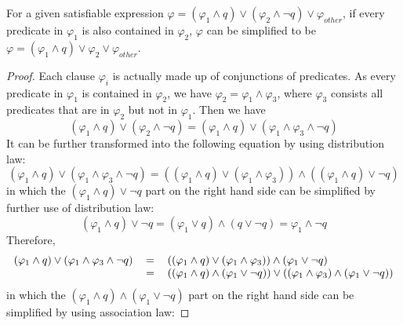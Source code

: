 \begin{theorem}
For a given satisfiable expression $\varphi = (\varphi _{1} \wedge q) \vee (\varphi _{2} \wedge \neg q) \vee \varphi _{other}$, if every predicate in $\varphi _{1}$ is also contained in $\varphi _{2}$,
$\varphi$ can be simplified to be $\varphi = (\varphi _{1} \wedge q) \vee \varphi _{2} \vee \varphi _{other}$.
\end{theorem}
\begin{proof}
Each clause $\varphi _{i}$ is actually made up of conjunctions of predicates. As every predicate in $\varphi _{1}$ is contained in $\varphi _{2}$, we have $\varphi _{2} = \varphi _{1} \wedge \varphi _{3}$,
where $\varphi _{3}$ consists all predicates that are in $\varphi _{2}$ but not in $\varphi _{1}$. Then we have
\begin{equation}
(\varphi _{1} \wedge q) \vee (\varphi _{2} \wedge \neg q) = (\varphi _{1} \wedge q) \vee (\varphi _{1} \wedge \varphi _{3} \wedge \neg q)
\end{equation}
It can be further transformed into the following equation by using distribution law:
\begin{equation}
(\varphi _{1} \wedge q) \vee (\varphi _{1} \wedge \varphi _{3} \wedge \neg q) = ((\varphi _{1} \wedge q) \vee (\varphi _{1} \wedge \varphi _{3})) \wedge ((\varphi _{1} \wedge q) \vee \neg q)
\end{equation}
in which the $(\varphi _{1} \wedge q) \vee \neg q$ part on the right hand side can be simplified by further use of distribution law:
\begin{equation}
(\varphi _{1} \wedge q) \vee \neg q = (\varphi _{1} \vee q) \wedge (q \vee \neg q) = \varphi _{1} \wedge \neg q
\end{equation}
Therefore,
\begin{equation}
\begin{tabular}{rcl}
$(\varphi _{1} \wedge q) \vee (\varphi _{1} \wedge \varphi _{3} \wedge \neg q)$&$=$&$((\varphi _{1} \wedge q) \vee (\varphi _{1} \wedge \varphi _{3})) \wedge (\varphi _{1} \vee \neg q)$ \\
                                                                               &$=$&$((\varphi _{1} \wedge q) \wedge (\varphi _{1} \vee \neg q)) \vee ((\varphi _{1} \wedge \varphi _{3}) \wedge (\varphi _{1} \vee \neg q))$ \\
\end{tabular}
\end{equation}
in which the $(\varphi _{1} \wedge q) \wedge (\varphi _{1} \vee \neg q)$ part on the right hand side can be simplified by using association law:

\end{proof}
